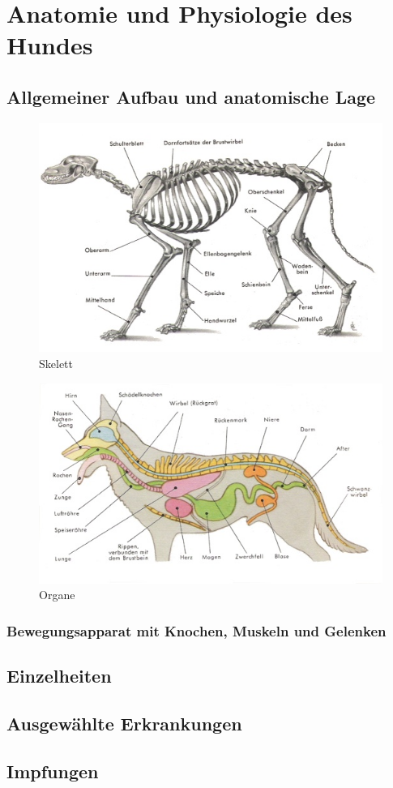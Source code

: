 \chapter{Anatomie und Physiologie des Hundes}


\section{Allgemeiner Aufbau und anatomische Lage}
        \begin{figure}[ht]
        \centering
        \includegraphics[width=1.0\textwidth]{./bilder/anatomie1.jpg}
        \caption{Skelett}
        \end{figure}

        \begin{figure}[ht]
        \centering
        \includegraphics[width=1.0\textwidth]{./bilder/anatomie2.jpg}
        \caption{Organe}
        \end{figure}

    \subsection{Bewegungsapparat mit Knochen, Muskeln und Gelenken}


\section{Einzelheiten}

\section{Ausgewählte Erkrankungen}

\section{Impfungen}